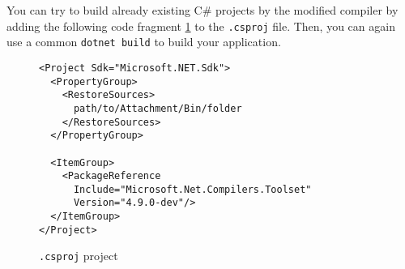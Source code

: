 You can try to build already existing C\# projects by the modified compiler by adding the following code fragment \ref{img81:usage} to the \texttt{.csproj} file. 
Then, you can again use a common \texttt{dotnet build} to build your application.
\begin{figure}[h!]
\begin{lstlisting}
<Project Sdk="Microsoft.NET.Sdk">
  <PropertyGroup>
    <RestoreSources>
      path/to/Attachment/Bin/folder
    </RestoreSources>
  </PropertyGroup>

  <ItemGroup>
    <PackageReference 
      Include="Microsoft.Net.Compilers.Toolset" 
      Version="4.9.0-dev"/>
  </ItemGroup>
</Project>
\end{lstlisting}
\caption{\texttt{.csproj} project}
\label{img81:usage}
\end{figure}